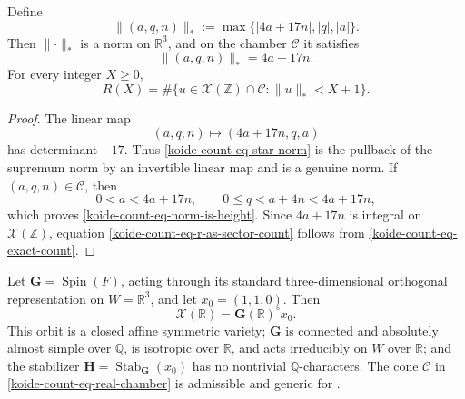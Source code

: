 \begin{lemma}
\label{koide-count-lem-genuine-norm}
Define
\begin{equation}
 \lVert(a,q,n)\rVert_*
 :=\max\{|4a+17n|,|q|,|a|\}.
 \label{koide-count-eq-star-norm}
\end{equation}
Then \(\lVert\cdot\rVert_*\) is a norm on \(\mathbb R^3\), and on the
chamber \(\mathcal C\) it satisfies
\begin{equation}
 \lVert(a,q,n)\rVert_*=4a+17n.
 \label{koide-count-eq-norm-is-height}
\end{equation}
For every integer \(X\geq0\),
\begin{equation}
 R(X)=\#\{u\in\mathscr X(\mathbb Z)\cap\mathcal C:
                    \lVert u\rVert_*<X+1\}.
 \label{koide-count-eq-r-as-sector-count}
\end{equation}
\end{lemma}

\begin{proof}
The linear map
\[
 (a,q,n)\longmapsto(4a+17n,q,a)
\]
has determinant \(-17\).  Thus \eqref{koide-count-eq-star-norm} is the
pullback of the supremum norm by an invertible linear map and is a genuine
norm.  If \((a,q,n)\in\mathcal C\), then
\[
 0<a<4a+17n,
 \qquad
 0\leq q<a+4n<4a+17n,
\]
which proves \eqref{koide-count-eq-norm-is-height}.  Since \(4a+17n\)
is integral on \(\mathscr X(\mathbb Z)\), equation
\eqref{koide-count-eq-r-as-sector-count} follows from
\eqref{koide-count-eq-exact-count}.
\end{proof}

\begin{lemma}
\label{koide-count-lem-gos-hypotheses}
Let \(\mathbf G=\operatorname{Spin}(F)\), acting through its standard
three-dimensional orthogonal representation on \(W=\mathbb R^3\), and let
\(x_0=(1,1,0)\).  Then
\[
 \mathscr X(\mathbb R)=\mathbf G(\mathbb R)^\circ x_0.
\]
This orbit is a closed affine symmetric variety; \(\mathbf G\) is connected
and absolutely almost simple over \(\mathbb Q\), is isotropic over
\(\mathbb R\), and acts irreducibly on \(W\) over \(\mathbb R\); and the
stabilizer \(\mathbf H=\operatorname{Stab}_{\mathbf G}(x_0)\) has no
nontrivial \(\mathbb Q\)-characters.  The cone \(\mathcal C\) in
\eqref{koide-count-eq-real-chamber} is admissible and generic for
\cite[Theorem~1.6]{GorodnikOhShah_2009}.
\end{lemma}

